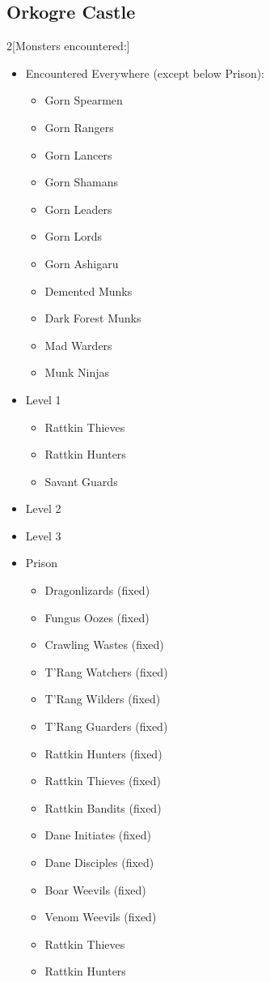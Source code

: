 \documentclass[11pt]{report}
\providecommand{\tightlist}{%
  \setlength{\itemsep}{0pt}\setlength{\parskip}{0pt}}
\newcommand{\indexPlace}[1]{\index{#1}}
\newcommand{\place}[1]{#1\indexPlace{#1}}
\newenvironment{twocolumnitemize}[1]
 {%
  \begin{multicols}{2}[#1]
  \raggedcolumns\RaggedRight
  \begin{itemize}
 }
 {%
  \end{itemize}
  \end{multicols}
 }
\begin{document}
\pagebreak\subsection{\place{Orkogre Castle}}\label{orkogre-castle}\nopagebreak%
%
\begin{twocolumnitemize}{Monsters encountered:}
\item Encountered Everywhere (except below Prison):

\begin{itemize}
\tightlist
\item
  Gorn Spearmen
\item
  Gorn Rangers
\item
  Gorn Lancers
\item
  Gorn Shamans
\item
  Gorn Leaders
\item
  Gorn Lords
\item
  Gorn Ashigaru
\item
  Demented Munks
\item
  Dark Forest Munks
\item
  Mad Warders
\item
  Munk Ninjas
\end{itemize}

\item Level 1

\begin{itemize}
\tightlist
\item
  Rattkin Thieves
\item
  Rattkin Hunters
\item
  Savant Guards
\end{itemize}

\item Level 2

\item Level 3

\item Prison

\begin{itemize}
\tightlist
\item
  Dragonlizards (fixed)
\item
  Fungus Oozes (fixed)
\item
  Crawling Wastes (fixed)
\item
  T'Rang Watchers (fixed)
\item
  T'Rang Wilders (fixed)
\item
  T'Rang Guarders (fixed)
\item
  Rattkin Hunters (fixed)
\item
  Rattkin Thieves (fixed)
\item
  Rattkin Bandits (fixed)
\item
  Dane Initiates (fixed)
\item
  Dane Disciples (fixed)
\item
  Boar Weevils (fixed)
\item
  Venom Weevils (fixed)
\item
  Rattkin Thieves
\item
  Rattkin Hunters
\end{itemize}


\end{twocolumnitemize}
\end{document}
